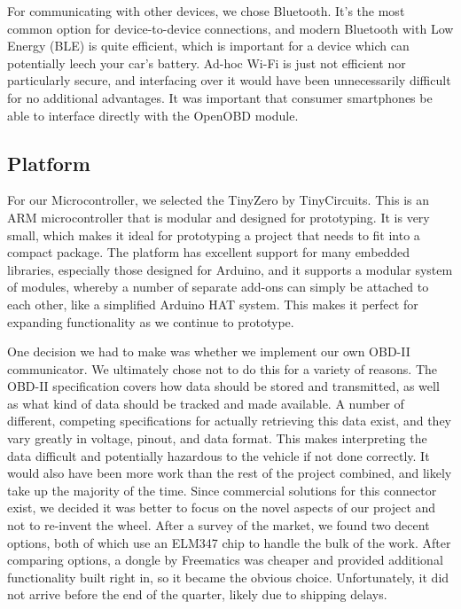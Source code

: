 \documentclass[10pt,letterpaper,unboxed,cm]{article}
\begin{document}
For communicating with other devices, we chose Bluetooth. It's the most common option for device-to-device connections, and modern Bluetooth with Low Energy (BLE) is quite efficient, which is important for a device which can potentially leech your car's battery. Ad-hoc Wi-Fi is just not efficient nor particularly secure, and interfacing over it would have been unnecessarily difficult for no additional advantages. It was important that consumer smartphones be able to interface directly with the OpenOBD module.

\subsection{Platform}

For our Microcontroller, we selected the TinyZero by TinyCircuits. This is an ARM microcontroller that is modular and designed for prototyping. It is very small, which makes it ideal for prototyping a project that needs to fit into a compact package. The platform has excellent support for many embedded libraries, especially those designed for Arduino, and it supports a modular system of  modules, whereby a number of separate add-ons can simply be attached to each other, like a simplified Arduino HAT system. This makes it perfect for expanding functionality as we continue to prototype.

One decision we had to make was whether we implement our own OBD-II communicator. We ultimately chose not to do this for a variety of reasons. The OBD-II specification covers how data should be stored and transmitted, as well as what kind of data should be tracked and made available. A number of different, competing specifications for actually retrieving this data exist, and they vary greatly in voltage, pinout, and data format. This makes interpreting the data difficult and potentially hazardous to the vehicle if not done correctly. It would also have been more work than the rest of the project combined, and likely take up the majority of the time. Since commercial solutions for this connector exist, we decided it was better to focus on the novel aspects of our project and not to re-invent the wheel. After a survey of the market, we found two decent options, both of which use an ELM347 chip to handle the bulk of the work. After comparing options, a dongle by Freematics was cheaper and provided additional functionality built right in, so it became the obvious choice. Unfortunately, it did not arrive before the end of the quarter, likely due to shipping delays.
\end{document}
